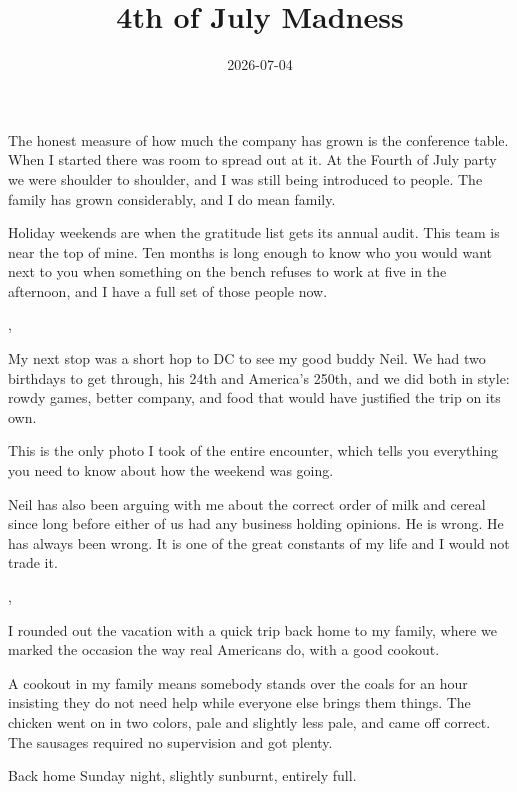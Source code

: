 
\title{4th of July Madness}
\date{2026-07-04}




The honest measure of how much the company has grown is the conference table.
When I started there was room to spread out at it. At the Fourth of July party
we were shoulder to shoulder, and I was still being introduced to people. The
family has grown considerably, and I do mean family.


Holiday weekends are when the gratitude list gets its annual audit. This team
is near the top of mine. Ten months is long enough to know who you would want
next to you when something on the bench refuses to work at five in the
afternoon, and I have a full set of those people now.

\sep

My next stop was a short hop to DC to see my good buddy Neil. We had two
birthdays to get through, his 24th and America's 250th, and we did both in
style: rowdy games, better company, and food that would have justified the trip
on its own.

This is the only photo I took of the entire encounter, which tells you
everything you need to know about how the weekend was going.


Neil has also been arguing with me about the correct order of milk and cereal
since long before either of us had any business holding opinions. He is wrong.
He has always been wrong. It is one of the great constants of my life and I
would not trade it.

\sep

I rounded out the vacation with a quick trip back home to my family, where we
marked the occasion the way real Americans do, with a good cookout.


A cookout in my family means somebody stands over the coals for an hour
insisting they do not need help while everyone else brings them things. The
chicken went on in two colors, pale and slightly less pale, and came off
correct. The sausages required no supervision and got plenty.

Back home Sunday night, slightly sunburnt, entirely full.


